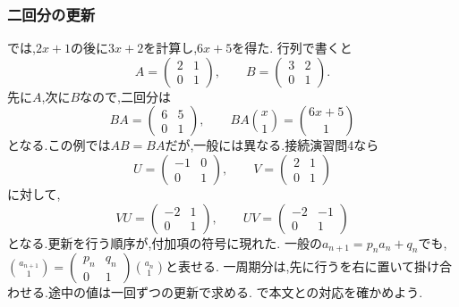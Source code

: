 \subsubsection{二回分の更新}\label{節：周期係数を行列で見直す}
  では,$2x+1$の後に$3x+2$を計算し,$6x+5$を得た.
  行列で書くと
  \[
    A=\begin{pmatrix}2&1\\0&1\end{pmatrix},\qquad
    B=\begin{pmatrix}3&2\\0&1\end{pmatrix}.
  \]
  先に$A$,次に$B$なので,二回分は
  \[
    BA=\begin{pmatrix}6&5\\0&1\end{pmatrix},\qquad
    BA\binom{x}{1}=\binom{6x+5}{1}
  \]
  となる.この例では$AB=BA$だが,一般には異なる.接続演習問4なら
  \[
    U=\begin{pmatrix}-1&0\\0&1\end{pmatrix},\qquad
    V=\begin{pmatrix}2&1\\0&1\end{pmatrix}
  \]
  に対して,
  \[
    VU=\begin{pmatrix}-2&1\\0&1\end{pmatrix},\qquad
    UV=\begin{pmatrix}-2&-1\\0&1\end{pmatrix}
  \]
  となる.更新を行う順序が,付加項の符号に現れた.
  一般の$a_{n+1}=p_na_n+q_n$でも,$\binom{a_{n+1}}1=
  \begin{pmatrix}p_n&q_n\\0&1\end{pmatrix}\binom{a_n}1$と表せる.
  一周期分は,先に行うを右に置いて掛け合わせる.途中の値は一回ずつの更新で求める.
  で本文との対応を確かめよう.
